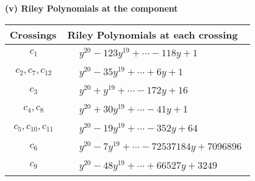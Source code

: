 \documentclass[1p]{elsarticle_modified}
\theoremstyle{definition}
\begin{document}
\flushleft \textbf{(v) Riley Polynomials at the component}\newline \\
\begin{tabular}{m{50pt}|m{274pt}}
Crossings & \hspace{64pt}Riley Polynomials at each crossing \\
\hline $$\begin{aligned}c_{1}\end{aligned}$$&$\begin{aligned}
&y^{20}-123 y^{19}+\cdots-118 y+1
\end{aligned}$\\
\hline $$\begin{aligned}c_{2},c_{7},c_{12}\end{aligned}$$&$\begin{aligned}
&y^{20}-35 y^{19}+\cdots+6 y+1
\end{aligned}$\\
\hline $$\begin{aligned}c_{3}\end{aligned}$$&$\begin{aligned}
&y^{20}+y^{19}+\cdots-172 y+16
\end{aligned}$\\
\hline $$\begin{aligned}c_{4},c_{8}\end{aligned}$$&$\begin{aligned}
&y^{20}+30 y^{19}+\cdots-41 y+1
\end{aligned}$\\
\hline $$\begin{aligned}c_{5},c_{10},c_{11}\end{aligned}$$&$\begin{aligned}
&y^{20}-19 y^{19}+\cdots-352 y+64
\end{aligned}$\\
\hline $$\begin{aligned}c_{6}\end{aligned}$$&$\begin{aligned}
&y^{20}-7 y^{19}+\cdots-72537184 y+7096896
\end{aligned}$\\
\hline $$\begin{aligned}c_{9}\end{aligned}$$&$\begin{aligned}
&y^{20}-48 y^{19}+\cdots+66527 y+3249
\end{aligned}$\\
\hline
\end{tabular}\\~\\
\end{document}
